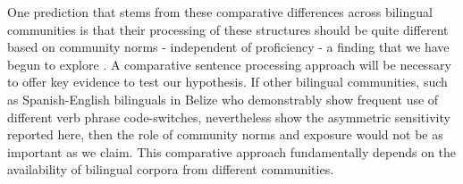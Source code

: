 \documentclass[output=paper,colorlinks,citecolor=brown]{langscibook}
\begin{document}
One prediction that stems from these comparative differences across bilingual communities is that their processing of these structures should be quite different based on community norms - independent of proficiency - a finding that we have begun to explore \citep{Treadwayetal2025}. A comparative sentence processing approach will be necessary to offer key evidence to test our hypothesis. If other bilingual communities, such as Spanish-English bilinguals in Belize who demonstrably show frequent use of different verb phrase code-switches, nevertheless show the asymmetric sensitivity reported here, then the role of community norms and exposure would not be as important as we claim. This comparative approach fundamentally depends on the availability of bilingual corpora from different communities.


\end{document}
